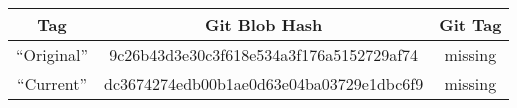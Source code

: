 
\begin{longtable}{|c|c|c|}

    \hline

    \rowcolor{McMasterMediumGrey}
    \textbf{Tag} & \textbf{Git Blob Hash}                   & \textbf{Git Tag}
    \\ \hline

    ``Original'' & 9c26b43d3e30c3f618e534a3f176a5152729af74 & missing
    \\ \hline

    ``Current''  & dc3674274edb00b1ae0d63e04ba03729e1dbc6f9 & missing
    \\ \hline
\end{longtable}
